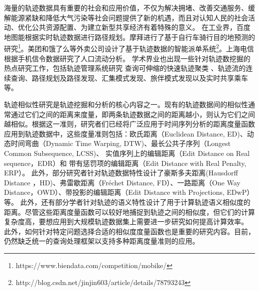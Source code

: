          海量的轨迹数据具有重要的社会和应用价值，不仅为解决拥堵、改善交通服务、缓解能源紧缺和降低大气污染等社会问题提供了新的机遇，而且对认知人民的社会活动、优化公共资源配置、为建立新型共享经济有着特殊的意义。
         在工业界，百度地图能根据实时轨迹数据进行路径规划。摩拜进行了基于自行车骑行目的地预测的研究\footnote{https://www.biendata.com/competition/mobike/}。美团和饿了么等外卖公司设计了基于轨迹数据的智能派单系统\footnote{http://blog.csdn.net/jinjin603/article/details/78793243}。上海电信根据手机信令数据研究了人口流动分析\cite{BT}。
         学术界业也出现一些针对轨迹数挖掘的热点研究工作，包括轨迹管理系统研究\cite{SharkDB,TanLN12,TrajSpark,trajectoryVLDB}
         查询可伸缩的快速轨迹聚类 \cite{DengHZHD15,CostaMM14,YuWWWH13,MaoSJZZ16}、轨迹流的连续查询\cite{NehmeR06}、路径规划及路径发现\cite{SacharidisPTKPMS08}、汇集模式发现\cite{ZhengZYS13}、旅伴模式发现\cite{TangZYHLHP12,LiCJT13}以及实时共享乘车\cite{DuanJWZY16}等。 
         
        
         轨迹相似性研究是轨迹挖掘和分析的核心内容之一。现有的轨迹数据间的相似性通常通过它们之间的距离来度量，即两条轨迹数据之间的距离越小，则认为它们之间越相似。根据这一准则，研究者们已经将广泛应用于时间序列分析的距离度量函数应用到轨迹数据中，这些度量准则包括：欧氏距离（Euclidean Distance, ED)\cite{DTKST}、动态时间弯曲（Dynamic Time Warping, DTW)\cite{bandwidth}、最长公共子序列（Longest Common Subsequence, LCSS)\cite{crowdsourced,SmartTrace}、
         实值序列上的编辑距离（Edit Distance on Real sequence，EDR）\cite{EDR}和 带有惩罚项的编辑距离（Edit Distance with Real Penalty, ERP）\cite{ERP}。
         此外，部分研究者针对轨迹数据特性设计了豪斯多夫距离(Hausdorff Distance ，HD)\cite{MaoSJZZ16}、弗雷歇距离（Fréchet Distance, FD）\cite{ZhuLYZHZ10,Guo2017}、一路距离（One Way Distance，OWD）\cite{LinS08}、带投影的编辑距离（Edit Distance with Projections, EDwP）\cite{RanuPTDR15}等。
         此外，还有部分学者针对轨迹的语义特性设计了用于计算轨迹语义相似度的距离\cite{Liu012,ZhaoX11,ZhengYZXSZ15}。尽管这些距离度量函数可以较好地捕捉到轨迹之间的相似度，但它们的计算复杂度高，要想应用到大规模轨迹数据集上需要进一步研究如何提高计算效率。
         此外，如何针对特定问题选择合适的相似度度量函数也是重要的研究内容\cite{Magdy2016Review,TooheyD15}。目前，仍然缺乏统一的查询处理框架以支持多种距离度量准则的应用。 
        
